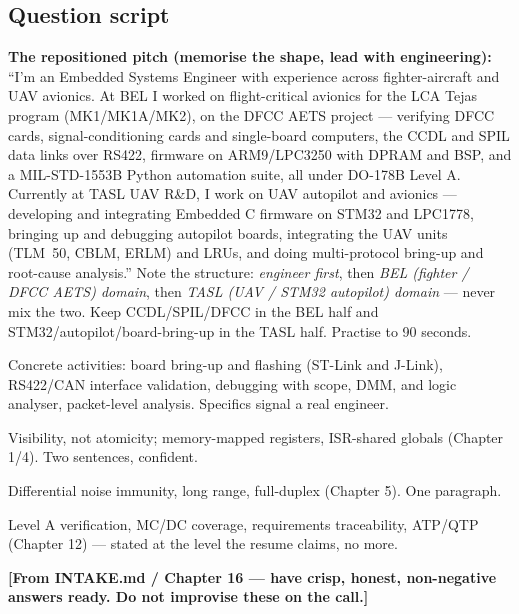 \subsection*{Question script}
\textbf{The repositioned pitch (memorise the shape, lead with engineering):}
``I'm an Embedded Systems Engineer with experience across fighter-aircraft and
UAV avionics. At BEL I worked on flight-critical avionics for the LCA Tejas
program (MK1/MK1A/MK2), on the DFCC AETS project --- verifying DFCC cards,
signal-conditioning cards and single-board computers, the CCDL and SPIL data
links over RS422, firmware on ARM9/LPC3250 with DPRAM and BSP, and a
MIL-STD-1553B Python automation suite, all under DO-178B Level A. Currently at
TASL UAV R\&D, I work on UAV autopilot and avionics --- developing and
integrating Embedded C firmware on STM32 and LPC1778, bringing up and debugging
autopilot boards, integrating the UAV units (TLM~50, CBLM, ERLM) and LRUs, and
doing multi-protocol bring-up and root-cause analysis.'' Note the structure:
\emph{engineer first}, then \emph{BEL (fighter / DFCC AETS) domain}, then
\emph{TASL (UAV / STM32 autopilot) domain} --- never mix the two. Keep
CCDL/SPIL/DFCC in the BEL half and STM32/autopilot/board-bring-up in the TASL
half. Practise to 90 seconds.

Concrete activities: board bring-up and flashing (ST-Link and J-Link),
RS422/CAN interface validation, debugging with scope, DMM, and logic analyser,
packet-level analysis. Specifics signal a real engineer.

Visibility, not atomicity; memory-mapped registers, ISR-shared globals
(Chapter 1/4). Two sentences, confident.

Differential noise immunity, long range, full-duplex (Chapter 5). One paragraph.

Level A verification, MC/DC coverage, requirements traceability, ATP/QTP
(Chapter 12) --- stated at the level the resume claims, no more.

\textbf{[From INTAKE.md / Chapter 16 --- have crisp, honest, non-negative
answers ready. Do not improvise these on the call.]}

